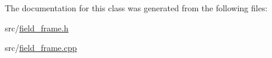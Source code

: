 The documentation for this class was generated from the following files\-:\begin{DoxyCompactItemize}
\item 
src/\hyperlink{a00227}{field\-\_\-frame.\-h}\item 
src/\hyperlink{a00226}{field\-\_\-frame.\-cpp}\end{DoxyCompactItemize}
